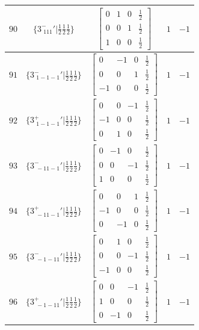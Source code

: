 \documentclass[fleqn,8pt]{jsarticle}
\begin{document}
\begin{longtable}{ccccc}
$ 90 $ & $ \{3^{-}_{\,\,111}{}'|\frac{1}{2} \frac{1}{2} \frac{1}{2}\} $ & $ \begin{bmatrix} 0 & 1 & 0 & \frac{1}{2} \\ 0 & 0 & 1 & \frac{1}{2} \\ 1 & 0 & 0 & \frac{1}{2} \end{bmatrix} $ & $ 1 $ & $ -1 $ \\ \hline
$ 91 $ & $ \{3^{-}_{\,\,1-1-1}{}'|\frac{1}{2} \frac{1}{2} \frac{1}{2}\} $ & $ \begin{bmatrix} 0 & -1 & 0 & \frac{1}{2} \\ 0 & 0 & 1 & \frac{1}{2} \\ -1 & 0 & 0 & \frac{1}{2} \end{bmatrix} $ & $ 1 $ & $ -1 $ \\ \hline
$ 92 $ & $ \{3^{+}_{\,\,1-1-1}{}'|\frac{1}{2} \frac{1}{2} \frac{1}{2}\} $ & $ \begin{bmatrix} 0 & 0 & -1 & \frac{1}{2} \\ -1 & 0 & 0 & \frac{1}{2} \\ 0 & 1 & 0 & \frac{1}{2} \end{bmatrix} $ & $ 1 $ & $ -1 $ \\ \hline
$ 93 $ & $ \{3^{-}_{\,\,-11-1}{}'|\frac{1}{2} \frac{1}{2} \frac{1}{2}\} $ & $ \begin{bmatrix} 0 & -1 & 0 & \frac{1}{2} \\ 0 & 0 & -1 & \frac{1}{2} \\ 1 & 0 & 0 & \frac{1}{2} \end{bmatrix} $ & $ 1 $ & $ -1 $ \\ \hline
$ 94 $ & $ \{3^{+}_{\,\,-11-1}{}'|\frac{1}{2} \frac{1}{2} \frac{1}{2}\} $ & $ \begin{bmatrix} 0 & 0 & 1 & \frac{1}{2} \\ -1 & 0 & 0 & \frac{1}{2} \\ 0 & -1 & 0 & \frac{1}{2} \end{bmatrix} $ & $ 1 $ & $ -1 $ \\ \hline
$ 95 $ & $ \{3^{-}_{\,\,-1-11}{}'|\frac{1}{2} \frac{1}{2} \frac{1}{2}\} $ & $ \begin{bmatrix} 0 & 1 & 0 & \frac{1}{2} \\ 0 & 0 & -1 & \frac{1}{2} \\ -1 & 0 & 0 & \frac{1}{2} \end{bmatrix} $ & $ 1 $ & $ -1 $ \\ \hline
$ 96 $ & $ \{3^{+}_{\,\,-1-11}{}'|\frac{1}{2} \frac{1}{2} \frac{1}{2}\} $ & $ \begin{bmatrix} 0 & 0 & -1 & \frac{1}{2} \\ 1 & 0 & 0 & \frac{1}{2} \\ 0 & -1 & 0 & \frac{1}{2} \end{bmatrix} $ & $ 1 $ & $ -1 $ \\
\end{longtable}
\end{document}
